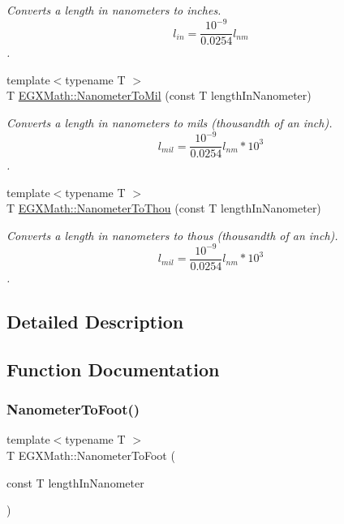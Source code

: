 \begin{DoxyCompactItemize}
\begin{DoxyCompactList}\small\item\em Converts a length in nanometers to inches. \[ l_{in}= \frac{10^{-9}}{0.0254} l_{nm} \]. \end{DoxyCompactList}\item 
{\footnotesize template$<$typename T $>$ }\\T \mbox{\hyperlink{group___e_g_x_math-_conversions-_length_conversions-_s_i-_nanometer-_imperial_gacfd62a86ae9a5085569840f3b7bbdb3e}{E\+G\+X\+Math\+::\+Nanometer\+To\+Mil}} (const T length\+In\+Nanometer)
\begin{DoxyCompactList}\small\item\em Converts a length in nanometers to mils (thousandth of an inch). \[ l_{mil}= \frac{10^{-9}}{0.0254} l_{nm} * 10^{3} \]. \end{DoxyCompactList}\item 
{\footnotesize template$<$typename T $>$ }\\T \mbox{\hyperlink{group___e_g_x_math-_conversions-_length_conversions-_s_i-_nanometer-_imperial_ga4c714a8d3ab333da358dafe181ebdcc4}{E\+G\+X\+Math\+::\+Nanometer\+To\+Thou}} (const T length\+In\+Nanometer)
\begin{DoxyCompactList}\small\item\em Converts a length in nanometers to thous (thousandth of an inch). \[ l_{mil}= \frac{10^{-9}}{0.0254} l_{nm} * 10^{3} \]. \end{DoxyCompactList}\end{DoxyCompactItemize}


\subsection{Detailed Description}


\subsection{Function Documentation}
\mbox{\label{group___e_g_x_math-_conversions-_length_conversions-_s_i-_nanometer-_imperial_ga7c6124e07aa11d37695c96c5a520197d}} 
\subsubsection{\texorpdfstring{Nanometer\+To\+Foot()}{NanometerToFoot()}}
{\footnotesize\ttfamily template$<$typename T $>$ \\
T E\+G\+X\+Math\+::\+Nanometer\+To\+Foot (\begin{DoxyParamCaption}\item[{const T}]{length\+In\+Nanometer }\end{DoxyParamCaption})}



